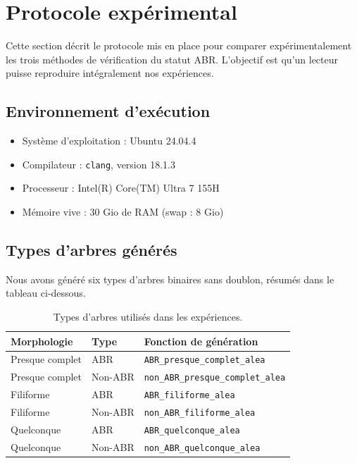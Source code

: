 \documentclass[12pt, a4paper]{article}
\begin{document}
\section{Protocole expérimental}

Cette section décrit le protocole mis en place pour comparer expérimentalement les trois méthodes de vérification
du statut ABR. L'objectif est qu'un lecteur puisse reproduire intégralement nos expériences.

\subsection{Environnement d'exécution}


\begin{itemize}
    \item Système d'exploitation : Ubuntu 24.04.4
    \item Compilateur : \texttt{clang}, version 18.1.3
    \item Processeur : Intel(R) Core(TM) Ultra 7 155H
    \item Mémoire vive : 30 Gio de RAM (swap : 8 Gio)
\end{itemize}

\subsection{Types d'arbres générés}

Nous avons généré six types d'arbres binaires sans doublon, résumés dans le tableau ci-dessous.

\begin{table}[H]
    \centering
    \begin{tabular}{lll}
        \toprule
        \textbf{Morphologie} & \textbf{Type} & \textbf{Fonction de génération} \\
        \midrule
        Presque complet & ABR     & \texttt{ABR\_presque\_complet\_alea} \\
        Presque complet & Non-ABR & \texttt{non\_ABR\_presque\_complet\_alea} \\
        Filiforme       & ABR     & \texttt{ABR\_filiforme\_alea} \\
        Filiforme       & Non-ABR & \texttt{non\_ABR\_filiforme\_alea} \\
        Quelconque      & ABR     & \texttt{ABR\_quelconque\_alea} \\
        Quelconque      & Non-ABR & \texttt{non\_ABR\_quelconque\_alea} \\
        \bottomrule
    \end{tabular}
    \caption{Types d'arbres utilisés dans les expériences.}
    \label{tab:types_arbres}
\end{table}
\end{document}
